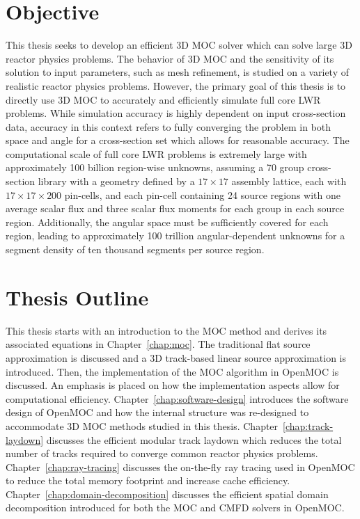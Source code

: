 \section{Objective}

This thesis seeks to develop an efficient 3D \ac{MOC} solver which can solve large 3D reactor physics problems. The behavior of 3D \ac{MOC} and the sensitivity of its solution to input parameters, such as mesh refinement, is studied on a variety of realistic reactor physics problems. However, the primary goal of this thesis is to directly use 3D \ac{MOC} to accurately and efficiently simulate full core \ac{LWR} problems. While simulation accuracy is highly dependent on input cross-section data, accuracy in this context refers to fully converging the problem in both space and angle for a cross-section set which allows for reasonable accuracy. The computational scale of full core \ac{LWR} problems is extremely large with approximately 100 billion region-wise unknowns, assuming a 70 group cross-section library with a geometry defined by a $17 \times 17$ assembly lattice, each with $17 \times 17 \times 200$ pin-cells, and each pin-cell containing 24 source regions with one average scalar flux and three scalar flux moments for each group in each source region. Additionally, the angular space must be sufficiently covered for each region, leading to approximately 100 trillion angular-dependent unknowns for a segment density of ten thousand segments per source region.

\section{Thesis Outline}

This thesis starts with an introduction to the \ac{MOC} method and derives its associated equations in Chapter~\ref{chap:moc}. The traditional flat source approximation is discussed and a 3D track-based linear source approximation is introduced. Then, the implementation of the \ac{MOC} algorithm in OpenMOC is discussed.  An emphasis is placed on how the implementation aspects allow for computational efficiency. Chapter~\ref{chap:software-design} introduces the software design of OpenMOC and how the internal structure was re-designed to accommodate 3D \ac{MOC} methods studied in this thesis. Chapter~\ref{chap:track-laydown} discusses the efficient modular track laydown which reduces the total number of tracks required to converge common reactor physics problems. Chapter~\ref{chap:ray-tracing} discusses the on-the-fly ray tracing used in OpenMOC to reduce the total memory footprint and increase cache efficiency. Chapter~\ref{chap:domain-decomposition} discusses the efficient spatial domain decomposition introduced for both the \ac{MOC} and \ac{CMFD} solvers in OpenMOC.

